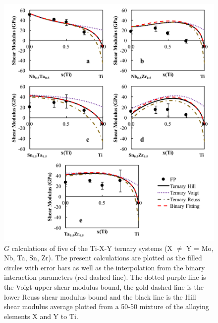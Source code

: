 \pagebreak
\begin{figure}[H]
	\centering
	\includegraphics[width=\textwidth]{Chapter-6/Figures/tixyshear2.png}
	\caption{$G$ calculations of five of the Ti-X-Y ternary systems (X $\neq$ Y = Mo, Nb, Ta, Sn, Zr). The present calculations are plotted as the filled circles with error bars as well as the interpolation from the binary interaction parameters (red dashed line). The dotted purple line is the Voigt upper shear modulus bound, the gold dashed line is the lower Reuss shear modulus bound and the black line is the Hill shear modulus average plotted from a 50-50 mixture of the alloying elements X and Y to Ti.}
	\label{Ch6-figure:tixyshear2}
\end{figure}

